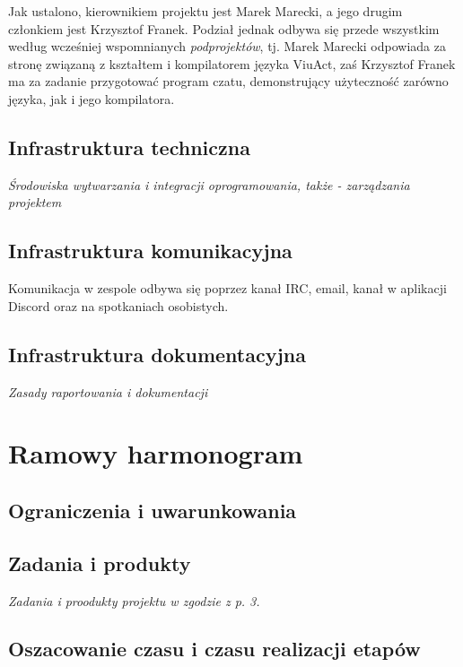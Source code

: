 \documentclass[11pt,oneside,a4paper,titlepage,onecolumn]{article}
\begin{document}
Jak ustalono, kierownikiem projektu jest Marek Marecki, a jego drugim członkiem jest Krzysztof Franek.
Podział jednak odbywa się przede wszystkim według wcześniej wspomnianych \textit{podprojektów}, tj. Marek
Marecki odpowiada za stronę związaną z kształtem i kompilatorem języka ViuAct, zaś Krzysztof Franek
ma za zadanie przygotować program czatu, demonstrujący użyteczność zarówno języka, jak i jego kompilatora.

\subsection{Infrastruktura techniczna}

\emph{Środowiska wytwarzania i integracji oprogramowania, także - zarządzania projektem}

\subsection{Infrastruktura komunikacyjna}

Komunikacja w zespole odbywa się poprzez kanał IRC, email, kanał w aplikacji Discord oraz na spotkaniach osobistych.

\subsection{Infrastruktura dokumentacyjna}

\emph{Zasady raportowania i dokumentacji}

\section{Ramowy harmonogram}

\subsection{Ograniczenia i uwarunkowania}

\subsection{Zadania i produkty}

\emph{Zadania i proodukty projektu w zgodzie z p. 3.}

\subsection{Oszacowanie czasu i czasu realizacji etapów}
\end{document}
